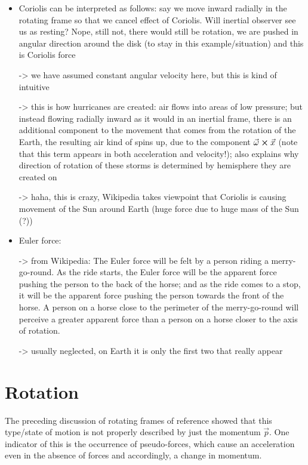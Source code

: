 \documentclass[../class_mech_main.tex]{subfiles}
\begin{document}
\begin{itemize}
    \item Coriolis can be interpreted as follows: say we move inward radially in the rotating frame so that we cancel effect of Coriolis. Will inertial observer see us as resting? Nope, still not, there would still be rotation, we are pushed in angular direction around the disk (to stay in this example/situation) and this is Coriolis force
    
    -> we have assumed constant angular velocity here, but this is kind of intuitive
    
    
    -> this is how hurricanes are created: air flows into areas of low pressure; but instead flowing radially inward as it would in an inertial frame, there is an additional component to the movement that comes from the rotation of the Earth, the resulting air kind of spins up, due to the component $\vec{\omega} \cross \vec{x}$ (note that this term appears in both acceleration and velocity!); also explains why direction of rotation of these storms is determined by hemisphere they are created on

    -> haha, this is crazy, Wikipedia takes viewpoint that Coriolis is causing movement of the Sun around Earth (huge force due to huge mass of the Sun (?))


    \item Euler force: 
    
    -> from Wikipedia: The Euler force will be felt by a person riding a merry-go-round. As the ride starts, the Euler force will be the apparent force pushing the person to the back of the horse; and as the ride comes to a stop, it will be the apparent force pushing the person towards the front of the horse. A person on a horse close to the perimeter of the merry-go-round will perceive a greater apparent force than a person on a horse closer to the axis of rotation. 
    
    -> usually neglected, on Earth it is only the first two that really appear
\end{itemize}



	\section{Rotation}
% 
% 
The preceding discussion of rotating frames of reference showed that this type/state of motion is not properly described by just the momentum $\vec{p}$. One indicator of this is the occurrence of pseudo-forces, which cause an acceleration even in the absence of forces and accordingly, a change in momentum.
\end{document}
